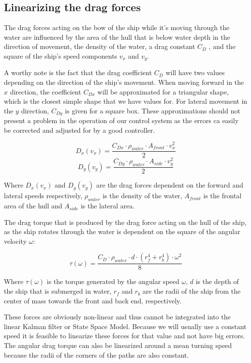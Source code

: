 \subsection{Linearizing the drag forces}
\label{sect:Linearizing drag forces}

The drag forces acting on the bow of the ship while it's moving through the water are influenced by the area of the hull that is below water depth in the direction of movement, the density of the water, a drag constant $ C_{D} $ , and the square of the ship's speed components $ v_{x} $ and $ v_{y} $. 

A worthy note is the fact that the drag coefficient $ C_{D} $ will have two values depending on the direction of the ship's movement. When moving forward in the $x$ direction, the coefficient $ C_{Dx} $ will be approximated for a triangular shape, which is the closest simple shape that we have values for. For lateral movement in the $y$ direction, $ C_{Dy} $ is given for a square box. These approximations should not present a problem in the operation of our control system as the errors ca easily be corrected and adjusted for by a good controller.

\[ D_{x}(v_{x}) = \frac{C_{Dx}\cdot\rho_{water}\cdot A_{front}\cdot v_{x}^{2}}{2} \]
\[ D_{y}(v_{y}) = \frac{C_{Dy}\cdot\rho_{water}\cdot A_{side}\cdot  v_{y}^{2}}{2} \]

Where $ D_{x}(v_{x}) $ and $ D_{y}(v_{y})$ are the drag forces dependent on the forward and lateral speeds respectively, $ \rho_{water} $ is the density of the water, $ A_{front} $ is the frontal area of the hull and $ A_{side} $ is the lateral area. 

The drag torque that is produced by the drag force acting on the hull of the ship, as the ship rotates through the water is dependent on the square of the angular velocity $ \omega $:

\[ \tau(\omega) = \frac{C_{D} \cdot \rho_{water} \cdot d \cdot (r_{f}^{4} + r_{b}^{4}) \cdot \omega^{2}}{8} \]

Where $ \tau(\omega) $ is the torque generated by the angular speed $ \omega $, $ d  $ is the depth of the ship that is submerged in water, $ r_{f} $ and $ r_{b} $ are the radii of the ship from the center of mass towards the front and back end, respectively.

These forces are obviously non-linear and thus cannot be integrated into the linear Kalman filter or State Space Model. Because we will usually use a constant speed it is feasible to linearize these forces for that value and not have big errors. The angular drag torque can also be linearized around a mean turning speed because the radii of the corners of the paths are also constant.

